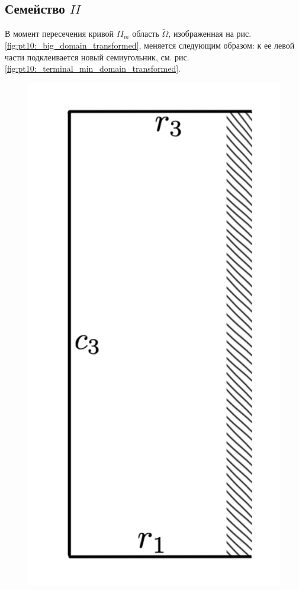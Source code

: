  \subsection{Семейство $II$}
 В момент пересечения кривой $II_m$ область $\widetilde{\Omega}$, изображенная на рис.     \ref{fig:pt10:_big_domain_transformed}, меняется следующим образом:
 к ее левой части подклеивается новый семиугольник, см. рис.     \ref{fig:pt10:_terminal_min_domain_transformed}.
 \begin{figure}[!htb]
\centering
\includegraphics[scale=0.12]{images/ch4/section3_circular/atoms/II/before/before_page_segment.pdf}

\end{figure}

